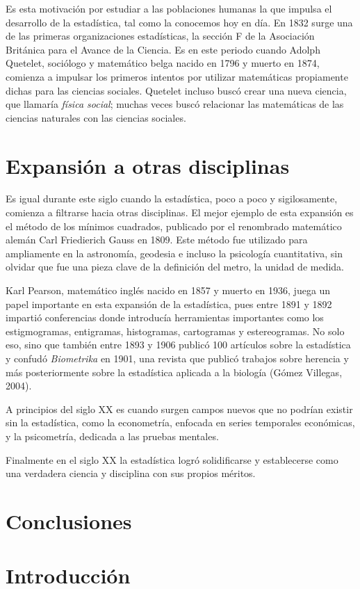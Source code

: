\documentclass[12pt, a4paper]{article}
\begin{document}
Es esta motivación por estudiar a las poblaciones humanas la que impulsa el desarrollo de la estadística, tal como la conocemos hoy en día. En 1832 surge una de las primeras organizaciones estadísticas, la sección F de la Asociación Británica para el Avance de la Ciencia. Es en este periodo cuando Adolph Quetelet, sociólogo y matemático belga nacido en 1796 y muerto en 1874, comienza a impulsar los primeros intentos por utilizar matemáticas propiamente dichas para las ciencias sociales. Quetelet incluso buscó crear una nueva ciencia, que llamaría \textit{física social}; muchas veces buscó relacionar las matemáticas de las ciencias naturales con las ciencias sociales.

\section{Expansión a otras disciplinas}

Es igual durante este siglo cuando la estadística, poco a poco y sigilosamente, comienza a filtrarse hacia otras disciplinas. El mejor ejemplo de esta expansión es el método de los mínimos cuadrados, publicado por el renombrado matemático alemán Carl Friedierich Gauss en 1809. Este método fue utilizado para ampliamente en la astronomía, geodesia e incluso la psicología cuantitativa, sin olvidar que fue una pieza clave de la definición del metro, la unidad de medida.

Karl Pearson, matemático inglés nacido en 1857 y muerto en 1936, juega un papel importante en esta expansión de la estadística, pues entre 1891 y 1892 impartió conferencias donde introducía herramientas importantes como los estigmogramas, entigramas, histogramas, cartogramas y estereogramas. No solo eso, sino que también entre 1893 y 1906 publicó 100 artículos sobre la estadística y confudó \textit{Biometrika} en 1901, una revista que publicó trabajos sobre herencia y más posteriormente sobre la estadística aplicada a la biología (Gómez Villegas, 2004).

A principios del siglo XX es cuando surgen campos nuevos que no podrían existir sin la estadística, como la econometría, enfocada en series temporales económicas, y la psicometría, dedicada a las pruebas mentales.

Finalmente en el siglo XX la estadística logró solidificarse y establecerse como una verdadera ciencia y disciplina con sus propios méritos.

\section{Conclusiones}

\section{Introducción}
\end{document}
